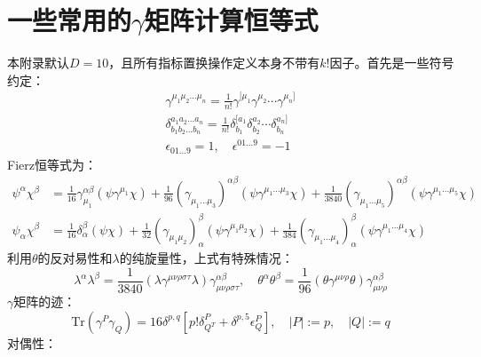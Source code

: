 \chapter{一些常用的$\gamma$矩阵计算恒等式}
本附录默认$D=10$，且所有指标置换操作定义本身不带有$k!$因子。首先是一些符号约定：
\begin{equation}
\begin{aligned}
		\gamma^{\mu_1\mu_2...\mu_n} = \frac{1}{n!} \gamma^{[\mu_1} \gamma^{\mu_2} \cdots \gamma^{\mu_n]}\\
	\delta_{b_1b_2...b_n}^{a_1a_2...a_n}=\frac{1}{n!}\delta_{b_1}^{[a_1}\delta_{b_2}^{a_2}\cdots\delta_{b_n}^{a_n]}\\
	\epsilon_{01...9}=1,\quad\epsilon^{01...9}=-1
\end{aligned}
\end{equation}
Fierz恒等式为：
\begin{align}
		\psi^\alpha \chi^\beta &= \frac{1}{16} \gamma_{\mu_1}^{\alpha\beta} (\psi \gamma^{\mu_1} \chi) + \frac{1}{96} (\gamma_{\mu_1...\mu_3})^{\alpha\beta} (\psi \gamma^{\mu_1...\mu_3} \chi) + \frac{1}{3840} (\gamma_{\mu_1...\mu_5})^{\alpha\beta} (\psi \gamma^{\mu_1...\mu_5} \chi) \\
		\psi_\alpha \chi^\beta &= \frac{1}{16} \delta_\alpha^\beta (\psi \chi) + \frac{1}{32} (\gamma_{\mu_1\mu_2})_\alpha^\beta (\psi \gamma^{\mu_1\mu_2} \chi) + \frac{1}{384} (\gamma_{\mu_1...\mu_4})_\alpha^\beta (\psi \gamma^{\mu_1...\mu_4} \chi)
\end{align}
利用$\theta$的反对易性和$\lambda$的纯旋量性，上式有特殊情况：
\begin{equation}
	\lambda^\alpha \lambda^\beta = \frac{1}{3840} (\lambda \gamma^{\mu\nu\rho\sigma\tau} \lambda) \gamma_{\mu\nu\rho\sigma\tau}^{\alpha\beta}, \quad \theta^\alpha \theta^\beta = \frac{1}{96} (\theta \gamma^{\mu\nu\rho} \theta) \gamma_{\mu\nu\rho}^{\alpha\beta}
\end{equation}
$\gamma$矩阵的迹：
\begin{equation}
	\mathrm{Tr}\left(\gamma^P\gamma_Q\right)=16\delta^{p,q}\left[p!\delta_{Q^T}^P+\delta^{p,5}\epsilon_Q^P\right],\quad|P|:=p,\quad|Q|:=q
\end{equation}
对偶性：
